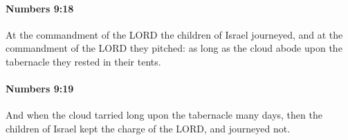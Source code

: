 		\paragraph{Numbers 9:18} %
			\label{NUMBERS-9-18}

			At the commandment of the LORD the children of Israel journeyed, and at the commandment of the LORD they pitched: as long as the cloud abode upon the tabernacle they rested in their tents.


		\paragraph{Numbers 9:19} %
			\label{NUMBERS-9-19}

			And when the cloud tarried long upon the tabernacle many days, then the children of Israel kept the charge of the LORD, and journeyed not.


